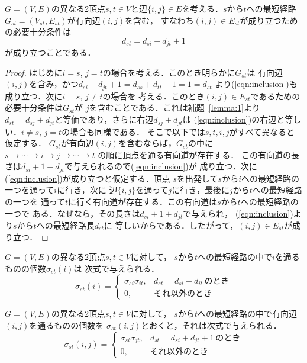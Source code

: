 \begin{lemma}
\rm 
$G=(V,E)$の異なる2頂点$s,t\in V$と辺$\{i,j\} \in E$を考える．$s$から$t$への最短経路$G_{st}=(V_{st},E_{st})$が有向辺$(i,j)$を含む，
すなわち$(i,j) \in E_{st}$が成り立つための必要十分条件は
\begin{equation}
d_{st}=d_{si}+d_{jt}+1
\label{eqn:inclusion}
\end{equation}
が成り立つことである．
\label{lemma:2}
\end{lemma}
\begin{proof}
はじめに$i=s$, $j=t$の場合を考える．このとき明らかに$G_{st}$は
有向辺$(i,j)$を含み，かつ$d_{si}+d_{jt}+1=d_{ss}+d_{tt}+1=1=d_{st}$
より(\ref{eqn:inclusion})も成り立つ．次に$i=s$, $j \neq t$の場合を
考える．このとき$(i,j)\in E_{st}$であるための必要十分条件は$G_{st}$が
$j$を含むことである．これは補題~\ref{lemma:1}より
$d_{st}=d_{sj}+d_{jt}$と等価であり，さらに右辺$d_{sj}+d_{jt}$は
(\ref{eqn:inclusion})の右辺と等しい．$i\neq s$, $j=t$の場合も同様である．
そこで以下では$s,t,i,j$がすべて異なると仮定する．
$G_{st}$が有向辺$(i,j)$を含むならば，$G_{st}$の中に
$s \rightarrow \cdots \rightarrow i \rightarrow j \rightarrow \cdots \rightarrow t$
の順に頂点を通る有向道が存在する．
この有向道の長さは$d_{si}+1+d_{jt}$で与えられるので(\ref{eqn:inclusion})が
成り立つ．次に(\ref{eqn:inclusion})が成り立つと仮定する．頂点
$s$を出発して$s$から$i$への最短経路の一つを通って$i$に行き，次に
辺$\{i,j\}$を通って$j$に行き，最後に$j$から$t$への最短経路の一つを
通って$t$に行く有向道が存在する．この有向道は$s$から$t$への最短経路の一つで
ある．なぜなら，その長さは$d_{si}+1+d_{jt}$で与えられ，
(\ref{eqn:inclusion})より$s$から$t$への最短経路長$d_{st}$に
等しいからである．したがって，$(i,j) \in E_{st}$が成り立つ．
\end{proof}
%
\begin{lemma}
\rm 
$G=(V,E)$の異なる2頂点$s,t \in V$に対して，
$s$から$t$への最短経路の中で$i$を通るものの個数$\sigma_{st}(i)$は
次式で与えられる．
\begin{equation}
\sigma_{st}(i)=
\left\{
\begin{array}{ll}
\sigma_{si} \sigma_{it}, & d_{st}=d_{si}+d_{it}\,\mbox{のとき} \\
0, & \mbox{それ以外のとき}
\end{array}
\right.
\label{eqn:sigma_sti}
\end{equation}
\label{lemma:3}
\end{lemma}

\begin{lemma}
\rm 
$G=(V,E)$の異なる2頂点$s,t \in V$に対して，
$s$から$t$への最短経路の中で有向辺$(i,j)$を通るものの個数を
$\sigma_{st}(i,j)$とおくと，それは次式で与えられる．
\begin{equation*}
\sigma_{st}(i,j)=
\left\{
\begin{array}{ll}
\sigma_{si} \sigma_{jt}, & d_{st}=d_{si}+d_{jt}+1\,\mbox{のとき} \\
0, & \mbox{それ以外のとき}
\end{array}
\right.
\end{equation*}
\label{lemma:4}
\end{lemma}

